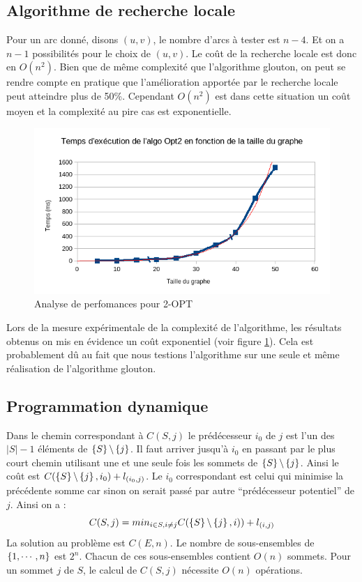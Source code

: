 \documentclass[11pt]{article} \usepackage[top=2cm, bottom=2cm, left=2cm, right=2cm]{geometry}
\begin{document}
\subsection*{Algorithme de recherche locale}
Pour un arc donné, disons $(u,v)$, le nombre d'arcs à tester est $n-4$. Et on a $n-1$ possibilités pour le choix de $(u,v)$. Le coût de la recherche locale est donc en $O(n^2)$. Bien que de même complexité que l'algorithme glouton, on peut se rendre compte en pratique que l'amélioration apportée par le recherche locale peut atteindre plus de 50\%. Cependant $O(n^2)$ est dans cette situation un coût moyen et la complexité au pire cas est exponentielle.
  \begin{figure}[ht]
\begin{center}
  \includegraphics[scale=0.8]{images/exec_opt2.png}
  \caption{Analyse de perfomances pour 2-OPT}
  \label{fig:opt2}
\end{center}
\end{figure}
Lors de la mesure expérimentale de la complexité de l'algorithme, les résultats obtenus on mis en évidence un coût exponentiel (voir figure \ref{fig:opt2}). Cela est probablement dû au fait que nous testions l'algorithme sur une seule et même réalisation de l'algorithme glouton.
\subsection*{Programmation dynamique}
Dans le chemin correspondant à $C(S,j)$ le prédécesseur $i_0$ de $j$ est l'un des $|S|-1$ éléments de
$\left\{S\right\} \backslash \left\{j\right\}$. Il faut arriver jusqu'à $i_0$ en passant par le plus court chemin utilisant une et une
seule fois les sommets de $\left\{S\right\} \backslash \left\{j\right\}$. Ainsi le coût est 
$C(\left\{S\right\} \backslash \left\{j\right\},i_0) + l_{(i_0,j)}$. Le $i_0$ correspondant est celui qui minimise la précédente somme car
sinon on serait passé par autre \enquote{prédécesseur potentiel} de $j$. Ainsi on a :
\begin{displaymath}
  C(S,j) = min_{i \in S , i \neq j}C(\left\{S\right\} \backslash \left\{j\right\},i)) + l_{(i,j)}
\end{displaymath}
La solution au problème est $C(E,n)$.
 Le nombre de sous-ensembles de $\left\{1,\cdots,n\right\}$ est $2^n$. Chacun de ces sous-ensembles contient $O(n)$ sommets. Pour
 un sommet $j$ de $S$, le calcul de $C(S,j)$ nécessite $O(n)$ opérations. 
\end{document}
